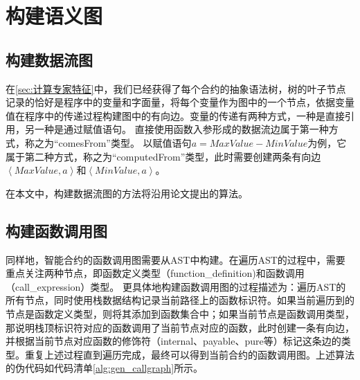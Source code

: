 \section{构建语义图}
\label{sec:构建语义图}
\subsection{构建数据流图}
\label{sec:构建数据流图}
在\autoref{sec:计算专家特征}中，我们已经获得了每个合约的抽象语法树，树的叶子节点记录的恰好是程序中的变量和字面量，将每个变量作为图中的一个节点，依据变量值在程序中的传递过程构建图中的有向边。变量的传递有两种方式，一种是直接引用，另一种是通过赋值语句。
直接使用函数入参形成的数据流边属于第一种方式，称之为“comesFrom”类型。
以赋值语句$a=MaxValue-MinValue$为例，它属于第二种方式，称之为“computedFrom”类型，此时需要创建两条有向边$\left\langle MaxValue,a\right\rangle$和$\left\langle MinValue,a\right\rangle$。

在本文中，构建数据流图的方法将沿用论文\cite{wu2021peculiar}提出的算法。
\subsection{构建函数调用图}
\label{sec:构建函数调用图}
同样地，智能合约的函数调用图需要从AST中构建。在遍历AST的过程中，需要重点关注两种节点，即函数定义类型（function\_definition)和函数调用（call\_expression）类型。
更具体地构建函数调用图的过程描述为：遍历AST的所有节点，同时使用栈数据结构记录当前路径上的函数标识符。如果当前遍历到的节点是函数定义类型，则将其添加到函数集合中；如果当前节点是函数调用类型，那说明栈顶标识符对应的函数调用了当前节点对应的函数，此时创建一条有向边，并根据当前节点对应函数的修饰符（internal、payable、pure等）标记这条边的类型。重复上述过程直到遍历完成，最终可以得到当前合约的函数调用图。上述算法的伪代码如代码清单\ref{alg:gen_callgraph}所示。


